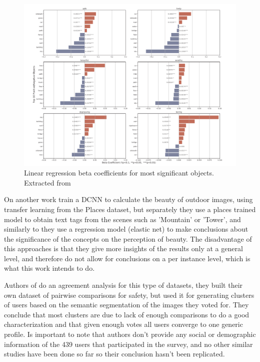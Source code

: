 \begin{figure}[ht]
	\begin{center}
	\includegraphics[width=1\textwidth]{./figures/zhang.png}
	\caption[Beta Coefficients]{ Linear regression beta coefficients for most significant objects. Extracted from  }
	\label{fig:beta}
	\end{center}
\end{figure}

On another work  train a DCNN to calculate the beauty of outdoor images,
using transfer learning from the Places dataset, but separately they use a places trained model to obtain text tags from
the scenes such as 'Mountain' or 'Tower', and similarly to  they use a regression model
(elastic net) to make conclusions about the significance of the concepts on the perception of beauty. The disadvantage
of this approaches is that they give more insights of the results only at a general level, and therefore do not allow for
conclusions on a per instance level, which is what this work intends to do.

Authors of  do an agreement analysis for this type of datasets,
they built their own dataset of pairwise comparisons for safety, but used it
for  generating clusters of users based on the semantic segmentation of the images they voted for.
They conclude that most clusters are due to lack of enough comparisons to do a good characterization
and that given enough votes all users converge to one generic profile. Is important to note
that authors don't provide any social or demographic information of the 439 users that
participated in the survey, and no other similar studies have been done so
far so their conclusion hasn't been replicated.

